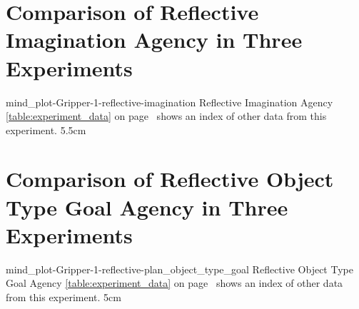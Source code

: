 {\clearpage
  \section{Comparison of Reflective Imagination Agency in Three Experiments}
  \experimentcausegroupplots{\dataappendixmaxtime}
                            {\dataappendixexperimentonemaxtime}
                            {\dataappendixexperimenttwomaxtime}
                            {\dataappendixexperimentthreemaxtime}
                            {\dataappendixexperimentonename}
                            {\dataappendixexperimenttwoname}
                            {\dataappendixexperimentthreename}
                            {\dataappendixexperimentoneprettyname}
                            {\dataappendixexperimenttwoprettyname}
                            \experimentcausegroupplotscontinued{\dataappendixexperimentthreeprettyname}
                                                               {mind_plot-Gripper-1-reflective-imagination}
                                                               {Reflective Imagination Agency}
                                                               {  {\mbox{\autoref{table:experiment_data}}} on
                                                                 {\mbox{page~\pageref{table:experiment_data}}} shows an index of other data
                                                                 from this experiment.}
                                                               {5.5cm}
}
{\clearpage
  \section{Comparison of Reflective Object Type Goal Agency in Three Experiments}
  \experimentcausegroupplots{\dataappendixmaxtime}
                            {\dataappendixexperimentonemaxtime}
                            {\dataappendixexperimenttwomaxtime}
                            {\dataappendixexperimentthreemaxtime}
                            {\dataappendixexperimentonename}
                            {\dataappendixexperimenttwoname}
                            {\dataappendixexperimentthreename}
                            {\dataappendixexperimentoneprettyname}
                            {\dataappendixexperimenttwoprettyname}
                            \experimentcausegroupplotscontinued{\dataappendixexperimentthreeprettyname}
                                                               {mind_plot-Gripper-1-reflective-plan_object_type_goal}
                                                               {Reflective Object Type Goal Agency}
                                                               {  {\mbox{\autoref{table:experiment_data}}} on
                                                                 {\mbox{page~\pageref{table:experiment_data}}} shows an index of other data
                                                                 from this experiment.}
                                                               {5cm}
}

